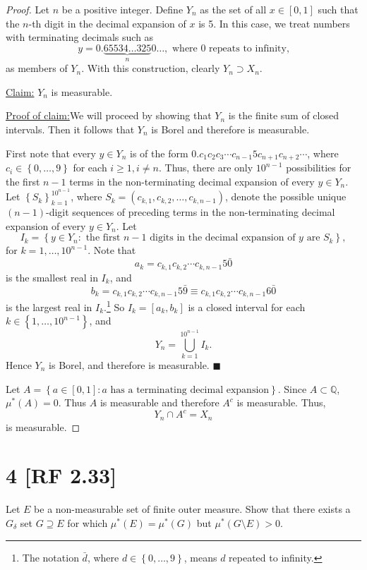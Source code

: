 \documentclass[12pt]{article}
\newenvironment{claimproof}[1]{\par\noindent\underline{Proof of claim:}\space#1}{\hfill $\blacksquare$}
\begin{document}
\begin{proof}
Let $n$ be a positive integer. Define $Y_{n}$ as the set of all $x \in [0,1]$ such that the $n$-th digit in the decimal expansion of $x$ is 5. In this
case, we treat numbers with terminating decimals such as
\[ y = 0.\underbrace{65534\dots 325}_{n}0\dots, \text{ where $0$ repeats to infinity,} \] 
as members of $Y_{n}$. With this construction, clearly $Y_{n} \supset X_{n}$.

\underline{Claim:} $Y_{n}$ is measurable. 
\begin{claimproof}
We will proceed by showing that $Y_{n}$ is the finite sum of closed intervals. Then it follows that $Y_{n}$ is Borel and therefore is measurable.

First note that every $y \in Y_{n}$ is of the form $0.c_{1}c_2c_3\cdots c_{n-1}5c_{n+1}c_{n+2}\cdots$, where $c_{i} \in \left\{ 0, \hdots, 9 \right\}$
for each $i \geq 1, i \neq n$. Thus, there are only $10^{n-1}$ possibilities for the first $n-1$ terms in the non-terminating decimal expansion of
every $y \in Y_{n}$. Let $\left\{ S_{k} \right\}_{k=1}^{10^{n-1}}$, where $S_{k} = \left( c_{k,1}, c_{k,2}, \hdots, c_{k,n-1} \right)$, denote the
possible unique $(n-1)$-digit sequences of preceding terms in the non-terminating decimal expansion of every $y \in Y_{n}$. Let 
\[ I_{k} = \left\{ y \in Y_{n} : \text{ the first $n-1$ digits in the decimal expansion of $y$ are $S_{k}$} \right\}, \]
for $k = 1, \hdots, 10^{n-1}$. Note that 
\[ a_{k} = c_{k,1}c_{k,2}\cdots c_{k,n-1}5\bar{0} \] 
is the smallest real in $I_{k}$, and 
\[ b_{k} = c_{k,1}c_{k,2}\cdots c_{k,n-1}5\bar{9} \equiv c_{k,1}c_{k,2}\cdots c_{k,n-1}6\bar{0} \]
is the largest real in $I_{k}$.\footnote{The notation $\bar{d}$, where $d \in \left\{ 0, \hdots, 9 \right\}$, means $d$ repeated to infinity.} So
$I_{k} = [a_{k}, b_{k}]$ is a closed interval for each $k \in \left\{ 1, \hdots, 10^{n-1} \right\}$, and 
\[ Y_{n} = \bigcup_{k=1}^{10^{n-1}} I_{k}. \]
Hence $Y_{n}$ is Borel, and therefore is measurable.
\end{claimproof}

Let $A = \left\{ a \in [0,1] : a\text{ has a terminating decimal expansion} \right\}$. Since $A \subset \mathbb{Q}$, $\mu^{*}(A) = 0$. Thus $A$ is
measurable and therefore $A^{c}$ is measurable. Thus,
\[ Y_{n} \cap A^{c} = X_{n} \]
is measurable.
\end{proof}


\newpage
\section*{4 [RF 2.33]}
Let $E$ be a non-measurable set of finite outer measure. Show that there exists a $G_{\delta}$ set $G \supseteq E$ for which $\mu^*(E) = \mu^*(G)$ but
$\mu^{*}(G\setminus E) > 0$.
\end{document}

